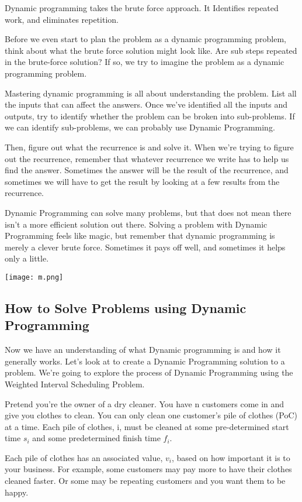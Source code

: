 \documentclass{article}
\begin{document}
Dynamic programming takes the brute force approach. It Identifies repeated work, and eliminates repetition. 

Before we even start to plan the problem as a dynamic programming problem, think about what the brute force solution might look like. Are sub steps repeated in the brute-force solution?  If so, we try to imagine the problem as a dynamic programming problem.

Mastering dynamic programming is all about understanding the problem. List all the inputs that can affect the answers. Once we've identified all the inputs and outputs, try to identify whether the problem can be broken into sub-problems. If we can identify sub-problems, we can probably use Dynamic Programming. 

Then, figure out what the recurrence is and solve it. When we're trying to figure out the recurrence, remember that whatever recurrence we write has to help us find the answer. Sometimes the answer will be the result of the recurrence, and sometimes we will have to get the result by looking at a few results from the recurrence.

Dynamic Programming can solve many problems, but that does not mean there isn't a more efficient solution out there. Solving a problem with Dynamic Programming feels like magic, but remember that dynamic programming is merely a clever brute force. Sometimes it pays off well, and sometimes it helps only a little.

\texttt{[image: m.png]}
\newpage
\subsection{How to Solve Problems using Dynamic Programming}
Now we have an understanding of what Dynamic programming is and how it generally works. Let's look at to create a Dynamic Programming solution to a problem. We're going to explore the process of Dynamic Programming using the Weighted Interval Scheduling Problem.

Pretend you're the owner of a dry cleaner. You have n customers come in and give you clothes to clean. You can only clean one customer's pile of clothes (PoC) at a time. Each pile of clothes, i, must be cleaned at some pre-determined start time $s_i$ and some predetermined finish time $f_i$.

Each pile of clothes has an associated value, $v_i$, based on how important it is to your business. For example, some customers may pay more to have their clothes cleaned faster. Or some may be repeating customers and you want them to be happy.
\end{document}
